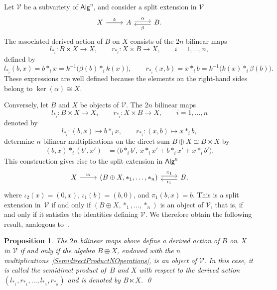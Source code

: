 \documentclass[reqno,a4paper]{amsart}
\theoremstyle{plain}
\newtheorem{proposition}[subsection]{Proposition}
\theoremstyle{definition}
\theoremstyle{remark}
\numberwithin{equation}{section}
\newcommand{\noproof}{\hfil\qed}
\newcommand{\V}{\mathcal{V}}
\newcommand{\Alg}{\ensuremath{\mathsf{Alg}}}
\begin{document}
Let $\V$ be a subvariety of $\Alg^n$, and consider a split extension in $\V$
\begin{equation}\label{SplitExtensionNOperations}
\begin{tikzcd}
X \arrow[r, "k"]
&
A \arrow[r, shift left, "\alpha"]
&
B. \arrow[l, shift left, "\beta"]
\end{tikzcd}
\end{equation}
The associated derived action of $B$ on $X$ consists of the $2n$ bilinear maps
\[
l_{\ast_i}\colon B\times X\to X,
\qquad
r_{\ast_i}\colon X\times B\to X,
\qquad
i=1,\ldots,n,
\]
defined by
\[
l_{\ast_i}(b,x)=b\ast_i x
=
k^{-1}\bigl(\beta(b)\ast_i k(x)\bigr),
\qquad
r_{\ast_i}(x,b)=x\ast_i b
=
k^{-1}\bigl(k(x)\ast_i\beta(b)\bigr).
\]
These expressions are well defined because the elements on the right-hand sides belong to $\ker(\alpha)\cong X$.

Conversely, let $B$ and $X$ be objects of $\V$. The $2n$ bilinear maps
\[
l_{\ast_i} \colon B\times X\to X,\qquad r_{\ast_i} \colon X\times B\to X, \qquad i=1,\ldots,n
\]
denoted by
\[
l_{\ast_i} \colon (b,x)\longmapsto b\ast_i x,\qquad
r_{\ast_i} \colon (x,b)\longmapsto x\ast_i b,
\]
determine $n$ bilinear multiplications on the direct sum $B\oplus X \cong B \times X$ by
\begin{align}\label{SemidirectProductNOperations}
(b,x)\ast_i(b',x')
&=
\bigl(b\ast_i b',\,x\ast_i x'+b\ast_ix'+x\ast_i b'\bigr).
\end{align}
This construction gives rise to the
split extension in $\Alg^n$
\begin{equation}
\begin{tikzcd}
X \arrow[r, "\iota_2"]
&
(B\oplus X, \ast_1, \ldots, \ast_n) \arrow[r, shift left, "\pi_1"]
&
B \arrow[l, shift left, "\iota_1"],
\end{tikzcd}
\end{equation}
where $\iota_2(x)=(0,x)$, $\iota_1(b)=(b,0)$, and $\pi_1(b,x)=b$. This is a split extension in~$\V$ if and only if
$(B\oplus X,\ast_1,\ldots,\ast_n)$ is an object of $\V$, that is, if and only if it satisfies the identities defining $\V$. We therefore obtain the
following result, analogous to~\cite[Theorem~2.4]{Orzech}.

\begin{proposition}
The $2n$ bilinear maps above define a \emph{derived action} of $B$ on~$X$ in $\V$ if and only if the algebra $B\oplus X$, endowed with the $n$ multiplications~\eqref{SemidirectProductNOperations}, is an object of $\V$. In this case, it is called the \emph{semidirect product} of~$B$ and $X$ with respect to the derived action $(l_{\ast_1},r_{\ast_1},\ldots,l_{\ast_n},r_{\ast_n})$ and is denoted by $B\ltimes X$. \noproof
\end{proposition}
\end{document}
